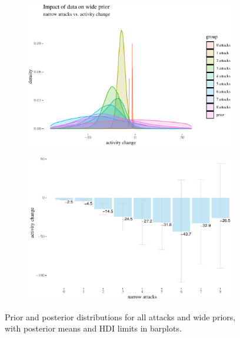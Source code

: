 \documentclass[10pt,]{scrartcl}
\begin{document}
\begin{figure}[!ht]
\begin{subfigure}[!ht]{0.9\textwidth}

\begin{center}\includegraphics[width=1\linewidth]{redditAnalysisWalkthrough_files/figure-latex/unnamed-chunk-57-1} \end{center}
\end{subfigure} 


\begin{subfigure}[!ht]{0.9\textwidth}

\begin{center}\includegraphics[width=1\linewidth]{redditAnalysisWalkthrough_files/figure-latex/unnamed-chunk-58-1} \end{center}
\end{subfigure}


\caption{Prior and posterior distributions for all attacks and wide priors, with posterior means and HDI limits in barplots.}
\label{fig:bayesian1}
\end{figure}
\end{document}
